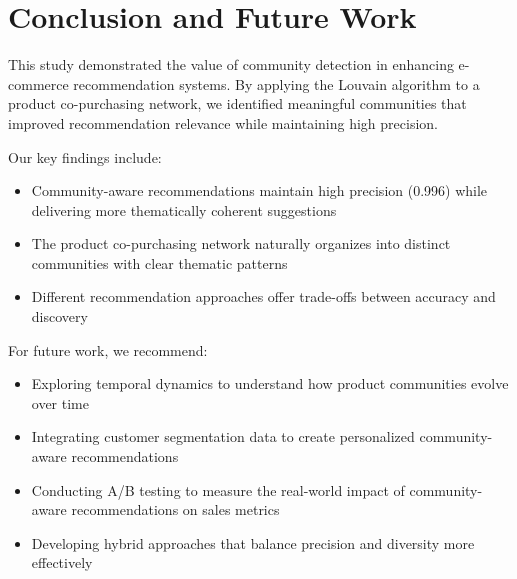\documentclass[conference]{IEEEtran}
\begin{document}
\section{Conclusion and Future Work}
This study demonstrated the value of community detection in enhancing e-commerce recommendation systems. By applying the Louvain algorithm to a product co-purchasing network, we identified meaningful communities that improved recommendation relevance while maintaining high precision.

Our key findings include:

\begin{itemize}
    \item Community-aware recommendations maintain high precision (0.996) while delivering more thematically coherent suggestions
    \item The product co-purchasing network naturally organizes into distinct communities with clear thematic patterns
    \item Different recommendation approaches offer trade-offs between accuracy and discovery
\end{itemize}

For future work, we recommend:

\begin{itemize}
    \item Exploring temporal dynamics to understand how product communities evolve over time
    \item Integrating customer segmentation data to create personalized community-aware recommendations
    \item Conducting A/B testing to measure the real-world impact of community-aware recommendations on sales metrics
    \item Developing hybrid approaches that balance precision and diversity more effectively
\end{itemize}



\end{document}
